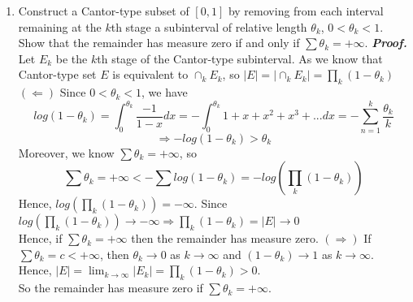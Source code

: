 \documentclass[a4paper,11pt]{article}
\begin{document}
\begin{enumerate}
\item Construct a Cantor-type subset of $[0,1]$ by removing from each interval remaining at the $k$th stage a subinterval of relative length $\theta_k$, $0 < \theta_k < 1$. Show that the remainder has measure zero if and only if $\sum \theta_k = +\infty$.
\newline
\newline
\textit{\textbf {Proof.}}
\newline
Let $E_k$ be the $k$th stage of the Cantor-type subinterval.
\newline
As we know that Cantor-type set $E$ is equivalent to $\cap_k E_k$, so $|E| = |\cap_k E_k| =\prod_k (1 - \theta_k)$
\newline
\newline
$(\Leftarrow)$
\newline
Since $0 < \theta_k < 1$, we have
$$log(1-\theta_k) = \int_0^{\theta_k} \frac{-1}{1-x} dx = -\int_0^{\theta_k} 1 + x + x^2 + x^3 + ... dx = -\sum_{n=1}^{k} \frac{\theta_k}{k}$$
$$\Rightarrow -log(1-\theta_k) > \theta_k$$
Moreover, we know $\sum \theta_k = +\infty$, so
$$\sum \theta_k = + \infty < - \sum log(1-\theta_k) = - log(\prod_k (1 -\theta_k))$$
Hence, $log(\prod_k (1 -\theta_k)) = -\infty$.
\newline
Since $log(\prod_k (1 -\theta_k)) \to -\infty \Rightarrow \prod_k (1 -\theta_k) = |E| \to 0$\\
Hence, if $\sum \theta_k = +\infty$ then the remainder has measure zero.
\newline
\newline
$(\Rightarrow)$
\newline
If $\sum \theta_k = c < +\infty$, then $\theta_k \to 0$ as $k \to \infty$ and $(1 - \theta_k) \to 1$ as $k \to \infty$.\\
Hence, $|E| = \lim_{k \to \infty} |E_k| = \prod_k (1 - \theta_k) > 0$.\\
So the remainder has measure zero if $\sum \theta_k = +\infty$.
\newline
\newline



\end{enumerate}
\end{document}
